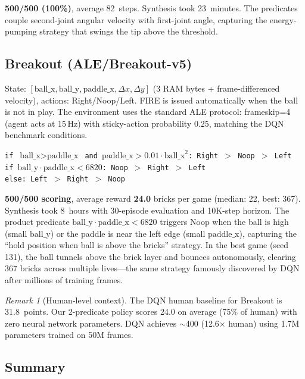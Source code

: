 \documentclass[9pt,a4paper]{article}
\theoremstyle{plain}
\theoremstyle{definition}
\theoremstyle{remark}
\newtheorem{remark}{Remark}
\begin{document}
\textbf{500/500 (100\%)}, average 82~steps. Synthesis took
23~minutes. The predicates couple second-joint angular velocity
with first-joint angle, capturing the energy-pumping strategy
that swings the tip above the threshold.

\subsection{Breakout (ALE/Breakout-v5)}

State: $[\text{ball\_x}, \text{ball\_y}, \text{paddle\_x},
\Delta x, \Delta y]$ (3 RAM bytes + frame-differenced velocity),
actions: Right/Noop/Left. FIRE is issued automatically when the
ball is not in play.
The environment uses the standard ALE protocol: frameskip=4
(agent acts at 15\,Hz) with sticky-action probability 0.25,
matching the DQN benchmark conditions.

\begin{center}
\texttt{if $\text{ball\_x} > \text{paddle\_x}$ and
$\text{paddle\_x} > 0.01 \cdot \text{ball\_x}^2$: Right $>$ Noop $>$ Left} \\
\texttt{if $\text{ball\_y} \cdot \text{paddle\_x} < 6820$: Noop $>$ Right $>$ Left} \\
\texttt{else: Left $>$ Right $>$ Noop}
\end{center}

\textbf{500/500 scoring}, average reward \textbf{24.0} bricks per game
(median: 22, best: 367). Synthesis took 8~hours with 30-episode
evaluation and 10K-step horizon. The product predicate
$\text{ball\_y} \cdot \text{paddle\_x} < 6820$ triggers Noop when the
ball is high (small $\text{ball\_y}$) or the paddle is near the left
edge (small $\text{paddle\_x}$), capturing the ``hold position when
ball is above the bricks'' strategy. In the best game (seed 131),
the ball tunnels above the brick layer and bounces autonomously,
clearing 367 bricks across multiple lives---the same strategy
famously discovered by DQN after millions of training frames.

\begin{remark}[Human-level context]
The DQN human baseline for Breakout is 31.8~points.
Our 2-predicate policy scores 24.0 on average (75\% of human)
with zero neural network parameters. DQN achieves $\sim$400
(12.6$\times$ human) using 1.7M parameters trained on 50M frames.
\end{remark}

\subsection{Summary}
\end{document}
